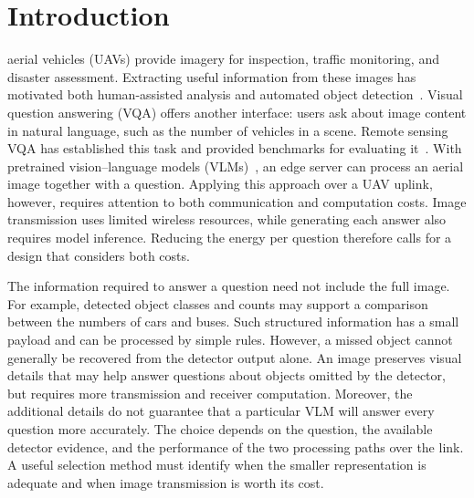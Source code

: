 \section{Introduction}\label{sec:intro}

 aerial vehicles (UAVs) provide imagery for
inspection, traffic monitoring, and disaster assessment. Extracting useful
information from these images has motivated both human-assisted analysis
and automated object detection~\cite{ofli2016combining,pi2020convolutional}.
Visual question answering (VQA) offers another interface: users ask about
image content in natural language, such as the number of vehicles in a
scene. Remote sensing VQA has established this task and provided
benchmarks for evaluating it~\cite{lobry2020rsvqa}. With pretrained
vision--language models (VLMs)~\cite{wang2024qwen2vl}, an edge server can
process an aerial image together with a question. Applying this approach
over a UAV uplink, however, requires attention to both communication and
computation costs. Image transmission uses limited wireless resources,
while generating each answer also requires model inference. Reducing
the energy per question therefore calls for a design that considers both
costs.

The information required to answer a question need not include the full
image. For example, detected object classes and counts may support a
comparison between the numbers of cars and buses. Such structured
information has a small payload and can be processed by simple rules.
However, a missed object cannot generally be recovered from the detector
output alone. An image preserves visual details that may help answer
questions about objects omitted by the detector, but requires more
transmission and receiver computation. Moreover, the additional details
do not guarantee that a particular VLM will answer every question more
accurately. The choice depends on the question, the available detector
evidence, and the performance of the two processing paths over the link.
A useful selection method must identify when the smaller representation
is adequate and when image transmission is worth its cost.

